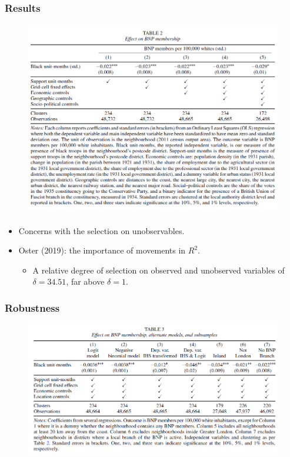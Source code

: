 \documentclass[dvipdfmx,11pt]{beamer}
\begin{document}
\begin{frame}\frametitle{Results}
  \begin{figure}
    \centering
    \includegraphics[scale = .6]{os1027tanji/T2}
  \end{figure}
\end{frame}

\begin{frame}\frametitle{}
  \begin{itemize}
    \item Concerns with the selection on unobservables.
    \item Oster (2019): the importance of movements in $R^2$.
    \begin{itemize}
      \item A relative degree of selection on observed and unobserved variables of $\delta = 34.51$, far above $\delta = 1$.
    \end{itemize}
  \end{itemize}
\end{frame}

\begin{frame}\frametitle{Robustness}
  \begin{figure}
    \centering
    \includegraphics[scale = .6]{os1027tanji/T3}
  \end{figure}
\end{frame}
\end{document}
